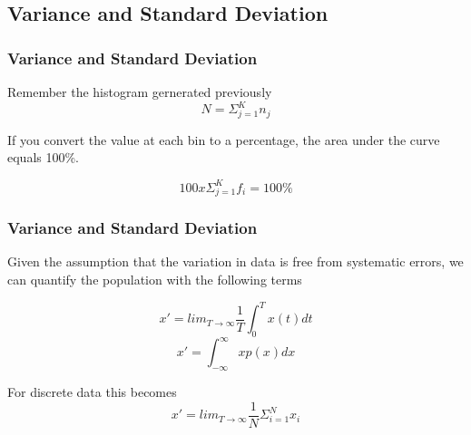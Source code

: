 \documentclass[fleqn]{beamer} %
\newcommand{\sectionIIsubsectionIItitle}{Variance and Standard Deviation}
\begin{document}
		\subsection{\sectionIIsubsectionIItitle}\label{sectionIIsubsectionII}

			\begin{frame}
				\frametitle{\sectionIIsubsectionIItitle}
        Remember the histogram gernerated previously
        \[ N=\Sigma_{j=1}^Kn_j \]
      
        If you convert the value at each bin to a percentage, the area under the curve equals 100\%.

        \[100x\Sigma_{j=1}^Kf_i=100\% \]

			\end{frame}

			\begin{frame}
				\frametitle{\sectionIIsubsectionIItitle}
        
        Given the assumption that the variation in data is free from systematic errors, we can quantify the population with the following terms

      \[ x' = lim_{T\rightarrow\infty}\frac{1}{T}\int_0^Tx(t)dt  \]
      \[ x' = \int_{-\infty}^\infty xp(x)dx \]
      
       For discrete data this becomes
\[x'= lim_{T\rightarrow\infty}\frac{1}{N}\Sigma_{i=1}^N x_i \]

			\end{frame}
			
\end{document}
